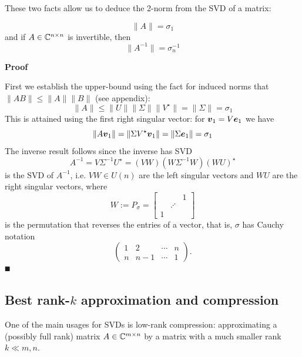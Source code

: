 These two facts allow us to deduce the 2-norm from the SVD of a matrix:

\begin{corollary}
\[
\|A \| = \ensuremath{\sigma}_1
\]
and if $A \in {\mathbb C}^{n \times n}$ is invertible, then
\[
\|A^{-1} \| = \ensuremath{\sigma}_n^{-1}
\]
\end{corollary}
\textbf{Proof}

First we establish the upper-bound using the fact for induced norms that $\|A B\| \ensuremath{\leq} \|A\| \|B\|$ (see appendix):
\[
\|A \| \ensuremath{\leq}  \|U \| \| \ensuremath{\Sigma} \| \| V^\ensuremath{\star}\| = \| \ensuremath{\Sigma} \|  = \ensuremath{\sigma}_1
\]
This is attained using the first right singular vector: for $\bm{{\mbox{\boldmath$v$\unboldmath}}}_1 = V \bm{{\mbox{\boldmath$e$\unboldmath}}}_1$ we have
\[
\|A \bm{{\mbox{\boldmath$v$\unboldmath}}}_1\| = \|\Sigma V^\star \bm{{\mbox{\boldmath$v$\unboldmath}}}_1\| = \|\Sigma  \bm{{\mbox{\boldmath$e$\unboldmath}}}_1\| = \sigma_1
\]
The inverse result follows since the inverse has SVD
\[
A^{-1} = V \ensuremath{\Sigma}^{-1} U^\ensuremath{\star} = (V W) (W \ensuremath{\Sigma}^{-1} W) (W U)^\ensuremath{\star}
\]
is the SVD of $A^{-1}$, i.e. $VW \ensuremath{\in} U(n)$ are the left singular vectors and $W U$ are the right singular vectors, where
\[
W := P_\ensuremath{\sigma} = \begin{bmatrix} && 1 \\ & \ensuremath{\adots} \\ 1 \end{bmatrix}
\]
is the permutation that reverses the entries of a vector, that is, $\ensuremath{\sigma}$ has Cauchy notation
\[
\begin{pmatrix}
1 & 2 & \ensuremath{\cdots} & n \\
n & n-1 & \ensuremath{\cdots} & 1
\end{pmatrix}.
\]
\ensuremath{\QED}

\subsection{Best rank-$k$ approximation and compression}
One of the main usages for SVDs is low-rank compression: approximating a (possibly full rank) matrix $A \in {\mathbb C}^{m \times n}$ by a matrix with a much smaller rank $k \ensuremath{\ll} m,n$.

